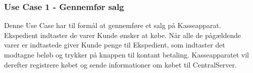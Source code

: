 \subsubsection{Use Case 1 - Gennemfør salg}
Denne Use Case har til formål at gennemføre et salg på Kasseapparat.
Ekspedient indtaster de varer Kunde ønsker at købe. Når alle de pågældende varer er indtastede giver Kunde penge til Ekspedient, som indtaster det modtagne beløb og trykker på knappen til kontant betaling. Kasseapparatet vil derefter registrere købet og sende informationer om købet til CentralServer.